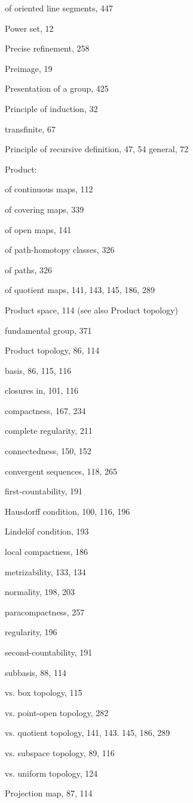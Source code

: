 of oriented line segments, 447

Power set, 12

Precise refinement, 258

Preimage, 19

Presentation of a group, 425

Principle of induction, 32

transfinite, 67

Principle of recursive definition, 47, 54 general, 72

Product:

of continuous maps, 112

of covering maps, 339

of open maps, 141

of path-homotopy classes, 326

of paths, 326

of quotient maps, 141, 143, 145, 186, 289

Product space, 114 (see also Product topology)

fundamental group, 371

Product topology, 86, 114

basis, 86, 115, 116

closures in, 101, 116

compactness, 167, 234

complete regularity, 211

connectedness, 150, 152

convergent sequences, 118, 265

first-countability, 191

Hausdorff condition, 100, 116, 196

Lindelöf condition, 193

local compactness, 186

metrizability, 133, 134

normality, 198, 203

paracompactness, 257

regularity, 196

second-countability, 191

subbasis, 88, 114

vs. box topology, 115

vs. point-open topology, 282

vs. quotient topology, 141, 143. 145, 186, 289

vs. subspace topology, 89, 116

vs. uniform topology, 124

Projection map, 87, 114

